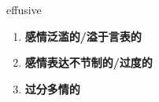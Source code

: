 
\begin{frame}
{\huge effusive}
\begin{center}
\begin{enumerate}\Large
  \item \textbf{感情泛滥的/溢于言表的}
  \item \textbf{感情表达不节制的/过度的}
  \item \textbf{过分多情的}
\end{enumerate}
\end{center}
\end{frame}

